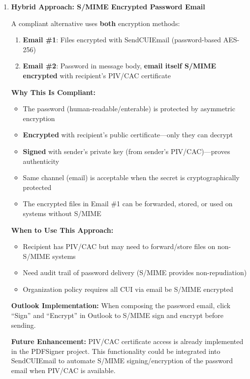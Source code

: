 \documentclass[11pt,letterpaper]{article}
\newcommand{\dmsection}[1]{\item \textbf{#1}\par}
\begin{document}
\begin{enumerate}
\dmsection{Hybrid Approach: S/MIME Encrypted Password Email}

A compliant alternative uses \textbf{both} encryption methods:

\begin{enumerate}
    \item \textbf{Email \#1}: Files encrypted with SendCUIEmail (password-based AES-256)
    \item \textbf{Email \#2}: Password in message body, \textbf{email itself S/MIME encrypted} with recipient's PIV/CAC certificate
\end{enumerate}

\textbf{Why This Is Compliant:}
\begin{itemize}
    \item The password (human-readable/enterable) is protected by asymmetric encryption
    \item \textbf{Encrypted} with recipient's public certificate---only they can decrypt
    \item \textbf{Signed} with sender's private key (from sender's PIV/CAC)---proves authenticity
    \item Same channel (email) is acceptable when the secret is cryptographically protected
    \item The encrypted files in Email \#1 can be forwarded, stored, or used on systems without S/MIME
\end{itemize}

\textbf{When to Use This Approach:}
\begin{itemize}
    \item Recipient has PIV/CAC but may need to forward/store files on non-S/MIME systems
    \item Need audit trail of password delivery (S/MIME provides non-repudiation)
    \item Organization policy requires all CUI via email be S/MIME encrypted
\end{itemize}

\textbf{Outlook Implementation:} When composing the password email, click ``Sign'' and ``Encrypt'' in Outlook to S/MIME sign and encrypt before sending.

\textbf{Future Enhancement:} PIV/CAC certificate access is already implemented in the PDFSigner project. This functionality could be integrated into SendCUIEmail to automate S/MIME signing/encryption of the password email when PIV/CAC is available.


\end{enumerate}
\end{document}
